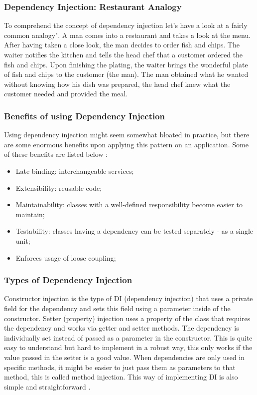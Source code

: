 \subsubsection{Dependency Injection: Restaurant Analogy}
To comprehend the concept of dependency injection let's have a look at a fairly common analogy". A man comes into a restaurant and takes a look at the menu. After having taken a close look, the man decides to order fish and chips. The waiter notifies the kitchen and tells the head chef that a customer ordered the fish and chips. Upon finishing the plating, the waiter brings the wonderful plate of fish and chips to the customer (the man). The man obtained what he wanted without knowing how his dish was prepared, the head chef knew what the customer needed and provided the meal.
\subsubsection{Benefits of using Dependency Injection}
Using dependency injection might seem somewhat bloated in practice, but there are some enormous benefits upon applying this pattern on an application. Some of these benefits are listed below \cite{Seemann2011}:
\begin{itemize}
\item Late binding: interchangeable services;
\item Extensibility: reusable code;
\item Maintainability: classes with a well-defined responsibility become easier to maintain;
\item Testability: classes having a dependency can be tested separately - as a single unit; 
\item Enforces usage of loose coupling;
\end{itemize}
\subsubsection{Types of Dependency Injection}
Constructor injection is the type of DI (dependency injection) that uses a private field for the dependency and sets this field using a parameter inside of the constructor. Setter (property) injection uses a property of the class that requires the dependency and works via getter and setter methods. The dependency is individually set instead of passed as a parameter in the constructor. This is quite easy to understand but hard to implement in a robust way, this only works if the value passed in the setter is a good value. When dependencies are only used in specific methods, it might be easier to just pass them as parameters to that method, this is called method injection. This way of implementing DI is also simple and straightforward \cite{TheoJungeblut2015}.

